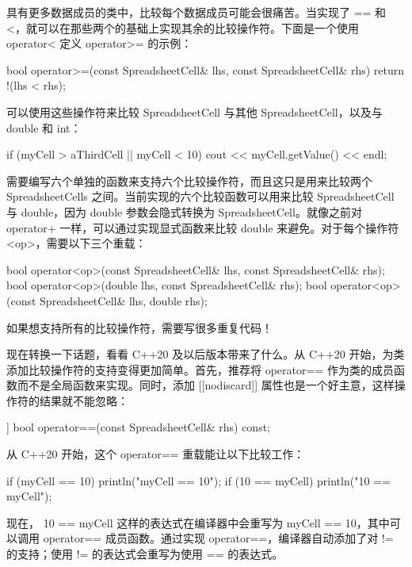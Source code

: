具有更多数据成员的类中，比较每个数据成员可能会很痛苦。当实现了 == 和 <，就可以在那些两个的基础上实现其余的比较操作符。下面是一个使用 operator< 定义 operator>= 的示例：

\begin{cpp}
bool operator>=(const SpreadsheetCell& lhs, const SpreadsheetCell& rhs)
{
    return !(lhs < rhs);
}
\end{cpp}

可以使用这些操作符来比较 SpreadsheetCell 与其他 SpreadsheetCell，以及与 double 和 int：

\begin{cpp}
if (myCell > aThirdCell || myCell < 10) {
    cout << myCell.getValue() << endl;
}
\end{cpp}

需要编写六个单独的函数来支持六个比较操作符，而且这只是用来比较两个 SpreadsheetCells 之间。当前实现的六个比较函数可以用来比较 SpreadsheetCell 与 double，因为 double 参数会隐式转换为 SpreadsheetCell。就像之前对 operator+ 一样，可以通过实现显式函数来比较 double 来避免。对于每个操作符<op>，需要以下三个重载：

\begin{cpp}
bool operator<op>(const SpreadsheetCell& lhs, const SpreadsheetCell& rhs);
bool operator<op>(double lhs, const SpreadsheetCell& rhs);
bool operator<op>(const SpreadsheetCell& lhs, double rhs);
\end{cpp}

如果想支持所有的比较操作符，需要写很多重复代码！


现在转换一下话题，看看 C++20 及以后版本带来了什么。从 C++20 开始，为类添加比较操作符的支持变得更加简单。首先，推荐将 operator== 作为类的成员函数而不是全局函数来实现。同时，添加 [[nodiscard]] 属性也是一个好主意，这样操作符的结果就不能忽略：

\begin{cpp}
[[nodiscard]] bool operator==(const SpreadsheetCell& rhs) const;
\end{cpp}

从 C++20 开始，这个 operator== 重载能让以下比较工作：

\begin{cpp}
if (myCell == 10) { println("myCell == 10"); }
if (10 == myCell) { println("10 == myCell"); }
\end{cpp}

现在， 10 == myCell 这样的表达式在编译器中会重写为 myCell == 10，其中可以调用 operator== 成员函数。通过实现 operator==，编译器自动添加了对 != 的支持；使用 != 的表达式会重写为使用 == 的表达式。

